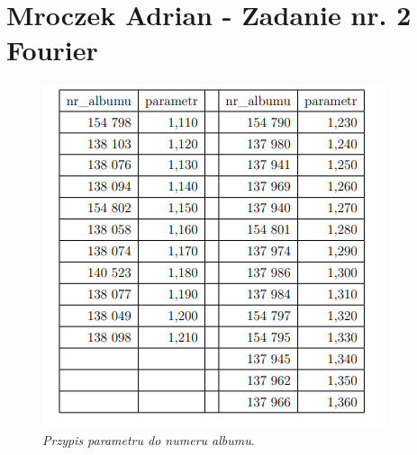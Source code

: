 \documentclass[12pt,oneside,a4paper]{book} %
\begin{document}
% 




\chapter{Mroczek Adrian - Zadanie nr. 2 Fourier }

\begin{figure}[h]
\begin{center} 
\includegraphics[scale=1]{./images/02.PNG} 
\caption{\textit{Przypis parametru do numeru albumu}.\newline }
\label{rys:logoup}
\end{center}
\end{figure}
\end{document}
